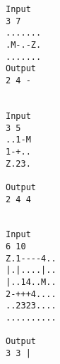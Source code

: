 \begin{verbatim}
Input
3 7
.......
.M-.-Z.
.......
Output
2 4 -


Input
3 5
..1-M
1-+..
Z.23.

Output
2 4 4


Input
6 10
Z.1----4..
|.|....|..
|..14..M..
2-+++4....
..2323....
..........

Output
3 3 |
\end{verbatim}
